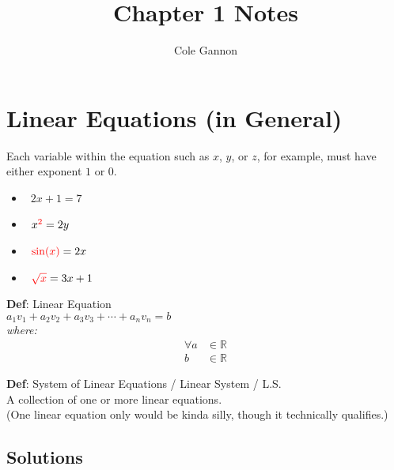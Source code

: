 \documentclass{article}
\title{Chapter 1 Notes}
\author{Cole Gannon}
\date{}
\def\chk{\ding{51}}
\def\xhk{\ding{55}}
\begin{document}
\maketitle

\section{Linear Equations (in General)}

Each variable within the equation such as $x$, $y$, or $z$, for example, must
have either exponent $1$ or $0$.

\begin{itemize}
   \item \chk\ $2x+1=7$
   \item \xhk\ $x^{\textcolor{red}{2}}=2y$
   \item \xhk\ $\textcolor{red}{\sin(x)}=2x$
   \item \xhk\ $\textcolor{red}{\sqrt{x}}=3x+1$
\end{itemize}

\begin{center}
   \textbf{Def}: Linear Equation\\
   $a_1v_1+a_2v_2+a_3v_3+\cdots+a_nv_n=b$\\
   \hspace{-5em}\textit{where:}\\
   \vspace{-2em}
   \begin{align*}
      \forall a&\in\mathbb{R}\\
      b&\in\mathbb{R}
   \end{align*}

   \textbf{Def}: System of Linear Equations / Linear System / L.S.\\
   A collection of one or more linear equations.\\
   (One linear equation only would be kinda silly,
   though it technically qualifies.)
\end{center}

\subsection{Solutions}
\end{document}
